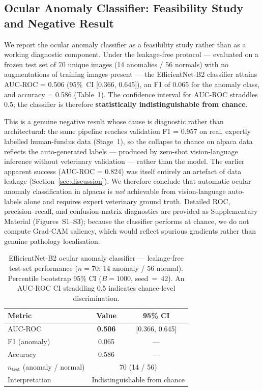 \documentclass[journal=animals,article=article,submit=mdpi,moreauthors=true,pdftex]{mdpi}
\begin{document}
\subsection{Ocular Anomaly Classifier: Feasibility Study and Negative Result}
\label{sec:res:classifier}

We report the ocular anomaly classifier as a feasibility study rather than as a working
diagnostic component. Under the leakage-free protocol --- evaluated on a frozen test set
of 70 unique images (14 anomalies / 56 normals) with no augmentations of training images
present --- the EfficientNet-B2 classifier attains AUC-ROC = 0.506 (95\%~CI
[0.366, 0.645]), an F1 of 0.065 for the anomaly class, and accuracy = 0.586
(Table~\ref{tab:classifier}). The confidence interval for AUC-ROC straddles 0.5;
the classifier is therefore \textbf{statistically indistinguishable from chance}.

This is a genuine negative result whose cause is diagnostic rather than architectural: the
same pipeline reaches validation F1 = 0.957 on real, expertly labelled human-fundus data
(Stage~1), so the collapse to chance on alpaca data reflects the auto-generated labels ---
produced by zero-shot vision-language inference without veterinary validation --- rather
than the model. The earlier apparent success (AUC-ROC = 0.824) was itself entirely an
artefact of data leakage (Section~\ref{sec:discussion}). We therefore conclude that
automatic ocular anomaly classification in alpacas is \emph{not} achievable from
vision-language auto-labels alone and requires expert veterinary ground truth. Detailed ROC,
precision--recall, and confusion-matrix diagnostics are provided as Supplementary Material
(Figures~S1--S3); because the classifier performs at chance, we do not compute Grad-CAM
saliency, which would reflect spurious gradients rather than genuine pathology
localisation.

\begin{table}[h]
\caption{EfficientNet-B2 ocular anomaly classifier --- leakage-free test-set performance
         ($n=70$: 14 anomaly / 56 normal). Percentile bootstrap 95\% CI ($B = 1000$,
         seed~=~42). An AUC-ROC CI straddling 0.5 indicates chance-level discrimination.}
\label{tab:classifier}
\small
\begin{tabular}{@{}lcc@{}}
\toprule
\textbf{Metric} & \textbf{Value} & \textbf{95\% CI} \\
\midrule
AUC-ROC          & \textbf{0.506} & {[}0.366, 0.645{]} \\
F1 (anomaly)     & 0.065 & --- \\
Accuracy         & 0.586 & --- \\
\midrule
$n_\text{test}$ (anomaly / normal) & \multicolumn{2}{c}{70 (14 / 56)} \\
Interpretation & \multicolumn{2}{c}{Indistinguishable from chance} \\
\bottomrule
\end{tabular}
\end{table}
\end{document}
